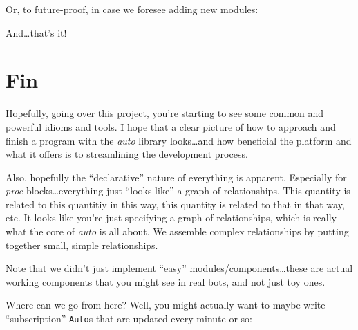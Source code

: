 \documentclass[]{article}
\newenvironment{Shaded}{}{}
\newcommand{\DataTypeTok}[1]{\textcolor[rgb]{0.56,0.13,0.00}{{#1}}}
\newcommand{\StringTok}[1]{\textcolor[rgb]{0.25,0.44,0.63}{{#1}}}
\newcommand{\CommentTok}[1]{\textcolor[rgb]{0.38,0.63,0.69}{\textit{{#1}}}}
\newcommand{\OtherTok}[1]{\textcolor[rgb]{0.00,0.44,0.13}{{#1}}}
\newcommand{\FunctionTok}[1]{\textcolor[rgb]{0.02,0.16,0.49}{{#1}}}
\newcommand{\NormalTok}[1]{{#1}}
\begin{document}
Or, to future-proof, in case we foresee adding new modules:

\begin{Shaded}
\end{Shaded}

And\ldots{}that's it!

\section{Fin}\label{fin}

Hopefully, going over this project, you're starting to see some common and powerful idioms and
tools. I hope that a clear picture of how to approach and finish a program with the \emph{auto}
library looks\ldots{}and how beneficial the platform and what it offers is to streamlining the
development process.

Also, hopefully the ``declarative'' nature of everything is apparent. Especially for \emph{proc}
blocks\ldots{}everything just ``looks like'' a graph of relationships. This quantity is related to
this quantitiy in this way, this quantity is related to that in that way, etc. It looks like you're
just specifying a graph of relationships, which is really what the core of \emph{auto} is all about.
We assemble complex relationships by putting together small, simple relationships.

Note that we didn't just implement ``easy'' modules/components\ldots{}these are actual working
components that you might see in real bots, and not just toy ones.

Where can we go from here? Well, you might actually want to maybe write ``subscription''
\texttt{Auto}s that are updated every minute or so:
\end{document}
